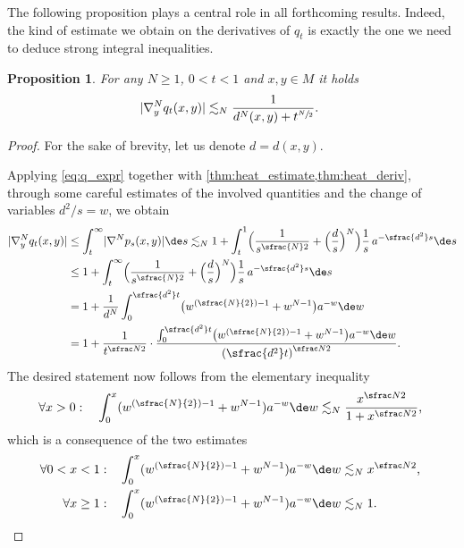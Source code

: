 \documentclass[10pt]{amsart}
\newcommand{\Psfrac}[2]{(\sfrac{#1}{#2})}
\newcounter{results}[section]
\theoremstyle{plain}
\newtheorem{proposition}[proposition]{Proposition}
\theoremstyle{definition}
\numberwithin{equation}{section}
\renewcommand{\comma}{\ensuremath{\text{, }}}
\newcommand{\comma}{\ensuremath{\text{, }}}
\newcommand{\fullstop}{\ensuremath{\text{. }}}
\DeclarePairedDelimiter\abs{\lvert}{\rvert}
\begin{document}
The following proposition plays a central role in all forthcoming results. Indeed, the kind of
estimate we obtain on the derivatives of $q_t$ is exactly the one we need to deduce strong
integral inequalities.
\begin{proposition}\label{prop:q_deriv}
For any $N\ge 1$, $0<t<1$ and $x,y\in M$ it holds
\begin{equation*}
\abs{\nabla^N_y q_t(x,y)} \lesssim_N \frac{1}{d^N(x,y)+t^{\sfrac N2}} \fullstop
\end{equation*}
\end{proposition}
\begin{proof}
For the sake of brevity, let us denote $d=d(x,y)$.

Applying \cref{eq:q_expr} together with \cref{thm:heat_estimate,thm:heat_deriv}, through some
careful estimates of the involved quantities and the change of variables $d^2/s=w$, we obtain
\begin{align*}
\abs{\nabla^N_y q_t(x,y)}
&\le \int_t^{\infty} \abs{\nabla^N p_s(x,y)}\de s
\lesssim_N 1 + \int_t^1\Bigl(\frac{1}{s^{\sfrac{N}2}}
+ \Bigl(\frac ds\Bigr)^N\Bigr)\frac 1s\, a^{-\sfrac{d^2}s}\de s \\
&\le 1 + \int_t^\infty\Bigl(\frac{1}{s^{\sfrac{N}2}}
+ \Bigl(\frac ds\Bigr)^N\Bigr)\frac 1s\, a^{-\sfrac{d^2}s}\de s \\
&= 1 + \frac 1{d^N}\int_0^{\sfrac{d^2}t}\bigl(w^{\Psfrac N2-1}+w^{N-1}\bigr)a^{-w}\de w \\
&= 1 + \frac 1{t^{\sfrac N2}}\cdot
\frac{\int_0^{\sfrac{d^2}t}\bigl(w^{\Psfrac N2-1}+w^{N-1}\bigr)a^{-w}\de w}
{\left(\sfrac{d^2}t\right)^{\sfrac N2}} \fullstop
\end{align*}
The desired statement now follows from the elementary inequality
\begin{equation*}
\forall x > 0:\quad \int_0^x (w^{\Psfrac N2-1} + w^{N-1})a^{-w}\de w \lesssim_N \frac{x^{\sfrac N2}}{1+x^{\sfrac N2}} \comma
\end{equation*}
which is a consequence of the two estimates
\begin{align*}
\forall 0 < x < 1:\quad &\int_0^x (w^{\Psfrac N2-1} + w^{N-1})a^{-w}\de w \lesssim_N x^{\sfrac N2} \comma\\
\forall x \ge 1:\quad &\int_0^x (w^{\Psfrac N2-1} + w^{N-1})a^{-w}\de w \lesssim_N 1 \fullstop\qedhere
\end{align*}
\end{proof}
\end{document}
